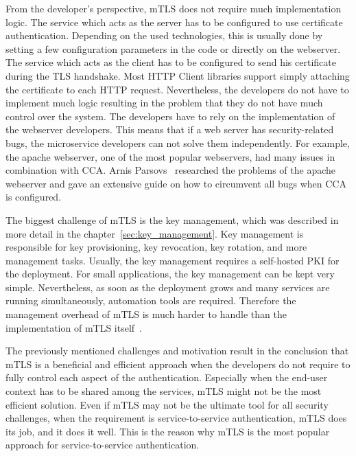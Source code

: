 From the developer's perspective, mTLS does not require much implementation logic.
The service which acts as the server has to be configured to use certificate authentication.
Depending on the used technologies, this is usually done by setting a few configuration parameters in the code or directly on the webserver.
The service which acts as the client has to be configured to send his certificate during the TLS handshake.
Most HTTP Client libraries support simply attaching the certificate to each HTTP request.
Nevertheless, the developers do not have to implement much logic resulting in the problem that they do not have much control over the system.
The developers have to rely on the implementation of the webserver developers.
This means that if a web server has security-related bugs, the microservice developers can not solve them independently.
For example, the apache webserver, one of the most popular webservers, had many issues in combination with CCA.
Arnis Parsovs~\cite{parsovs2013practical} researched the problems of the apache webserver and gave an extensive guide on how to circumvent all bugs when CCA is configured.

The biggest challenge of mTLS is the key management, which was described in more detail in the chapter~\ref{sec:key_management}.
Key management is responsible for key provisioning, key revocation, key rotation, and more management tasks.
Usually, the key management requires a self-hosted PKI for the deployment.
For small applications, the key management can be kept very simple.
Nevertheless, as soon as the deployment grows and many services are running simultaneously, automation tools are required.
Therefore the management overhead of mTLS is much harder to handle than the implementation of mTLS itself~\cite{dias2020microservices}.

The previously mentioned challenges and motivation result in the conclusion that mTLS is a beneficial and efficient approach when the developers do not require to fully control each aspect of the authentication.
Especially when the end-user context has to be shared among the services, mTLS might not be the most efficient solution.
Even if mTLS may not be the ultimate tool for all security challenges, when the requirement is service-to-service authentication, mTLS does its job, and it does it well.
This is the reason why mTLS is the most popular approach for service-to-service authentication.

